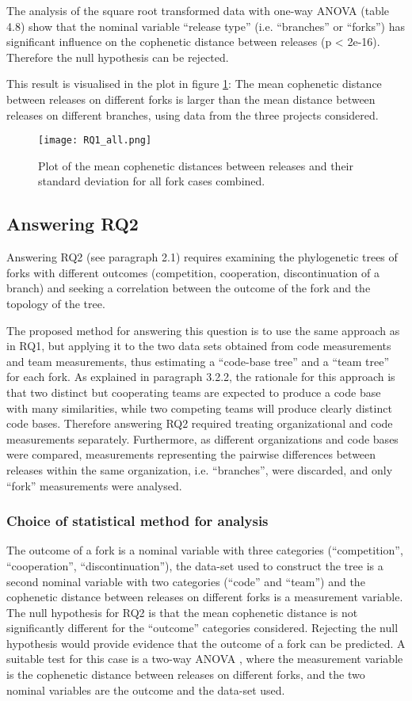The analysis of the square root transformed data with one-way ANOVA (table 4.8) show that the nominal variable “release type” (i.e. “branches” or “forks”) has significant influence on the cophenetic distance between releases (p < 2e-16). Therefore the null hypothesis can be rejected.

This result is visualised in the plot in figure \ref{fig:rq1_all}: The mean cophenetic distance between releases on different forks is larger than the mean distance between releases on different branches, using data from the three projects considered.

\begin{figure}[H]
  \texttt{[image: RQ1\_all.png]}
  \caption{Plot of the mean cophenetic distances between releases and their standard deviation for all fork cases combined.}
  \label{fig:rq1_all}
\end{figure}

\subsection{Answering RQ2}
Answering RQ2 (see paragraph 2.1) requires examining the phylogenetic trees of forks with different outcomes (competition, cooperation, discontinuation of a branch) and seeking a correlation between the outcome of the fork and the topology of the tree.

The proposed method for answering this question is to use the same approach as in RQ1, but applying it to the two data sets obtained from code measurements and team measurements, thus estimating a “code-base tree” and a “team tree” for each fork. As explained in paragraph 3.2.2, the rationale for this approach is that two distinct but cooperating teams are expected to produce a code base with many similarities, while two competing teams will produce clearly distinct code bases. Therefore answering RQ2 required treating organizational and code measurements separately. Furthermore, as different organizations and code bases were compared, measurements representing the pairwise differences between releases within the same organization, i.e. “branches”, were discarded, and only “fork” measurements were analysed.

\subsubsection{Choice of statistical method for analysis}
The outcome of a fork is a nominal variable with three categories (“competition”, “cooperation”, “discontinuation”), the data-set used to construct the tree is a second nominal variable with two categories (“code” and “team”) and the cophenetic distance between releases on different forks is a measurement variable. The null hypothesis for RQ2 is that the mean cophenetic distance is not significantly different for the “outcome” categories considered. Rejecting the null hypothesis would provide evidence that the outcome of a fork can be predicted. A suitable test for this case is a two-way ANOVA \citep{McDonald2014b}, where the measurement variable is the cophenetic distance between releases on different forks, and the two nominal variables are the outcome and the data-set used.

